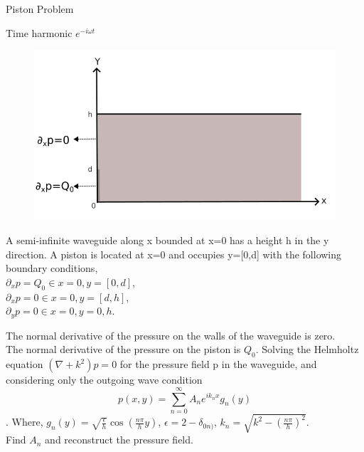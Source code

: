 \documentclass{beamer}
\title[Piston Problem]{}
\subtitle{}
\author[Monisha Muralidharan M]{}
\institute[]{\scriptsize }
\date{\tiny \today}
\begin{document}
\begin{frame}{Piston Problem}
    \scriptsize{
    \begin{minipage}{0.4\textwidth}
       
     Time harmonic $e^{-i\omega t}$
    \begin{figure}
        \centering
        \includegraphics[width=1\textwidth]{piston.png} 
    \end{figure}
    \end{minipage}
    \begin{minipage}{0.55\textwidth}

        A semi-infinite waveguide along x bounded at x=0 has a height h in the y direction.
        A piston is located at x=0 and occupies y=[0,d] with the following boundary conditions,\\
        $\partial_xp=Q_0 \in x=0, y=[0,d]$,\\
        $\partial_xp=0 \in x=0, y=[d,h]$,\\
        $\partial_yp=0 \in x=0, y=0,h$.\\
        
        

         \end{minipage}
        The normal derivative of the pressure on the walls of the waveguide is zero.\\
        The normal derivative of the pressure on the piston is $Q_0$.
        Solving the Helmholtz equation $(\nabla +k^2)p=0$ for the pressure field p in the waveguide,
        and considering only the outgoing wave condition \[ p(x,y)=\sum_{n=0}^{\infty}A_n e^{ik_nx} g_n(y)\]. Where, \quad$g_n(y)=\sqrt{\frac{\epsilon}{h}}\cos(\frac{n\pi}{h}y)$, $\epsilon=2-\delta_{0n)}$, $k_n=\sqrt{k^2-(\frac{n\pi}{h})^2}$.
        \\Find $A_n$ and reconstruct the pressure field.
    }
\end{frame}
\end{document}
